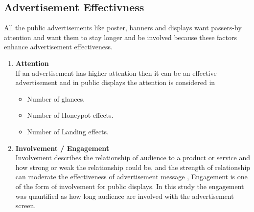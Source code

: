 \begin{itemize}
\begin{enumerate}
\end{enumerate}




\end{itemize}



\subsection{Advertisement Effectivness}
All the public advertisements like poster, banners and displays want passers-by attention and want them to stay longer and be involved because these factors enhance advertisement effectiveness.

\begin{enumerate}
\item \textbf{Attention} \\
If an advertisement has higher attention then it can be an effective advertisement\cite{add_effectivenss} and in public displays the attention is considered in 
\begin{itemize}
\item Number of glances.
\item Number of Honeypot effects.
\item Number of Landing effects.
\end{itemize}

\item \textbf{Involvement / Engagement} \\
Involvement describes the relationship of audience to a product or service and how strong or weak the relationship could be\cite{involment}, and the strength of relationship can moderate the effectiveness of advertisement message \cite{ audience_involvement}, Engagement is one of the form of involvement for public displays. In this study the engagement was quantified as how long audience are involved with the advertisement screen.
\end{enumerate}

